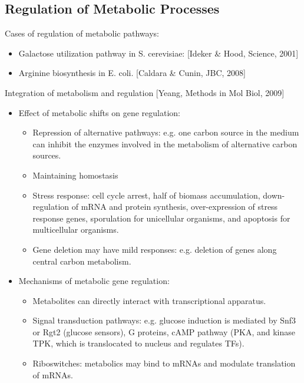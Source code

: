 \documentclass{report}
\begin{document}
\subsection{Regulation of Metabolic Processes}

Cases of regulation of metabolic pathways: 
\begin{itemize}
	\item Galactose utilization pathway in S. cerevisiae: [Ideker \& Hood, Science, 2001]
	\item Arginine biosynthesis in E. coli. [Caldara \& Cunin, JBC, 2008]
\end{itemize}

Integration of metabolism and regulation [Yeang, Methods in Mol Biol, 2009]
\begin{itemize}
\item Effect of metabolic shifts on gene regulation: 
\begin{itemize}
	\item Repression of alternative pathways: e.g. one carbon source in the medium can inhibit the enzymes involved in the metabolism of alternative carbon sources. 
	\item Maintaining homostasis
	\item Stress response: cell cycle arrest, half of biomass accumulation, down-regulation of mRNA and protein synthesis, over-expression of stress response genes, sporulation for unicellular organisms, and apoptosis for multicellular organisms.
	\item Gene deletion may have mild responses: e.g. deletion of genes along central carbon metabolism. 
\end{itemize}

\item Mechanisms of metabolic gene regulation: 
\begin{itemize}
	\item Metabolites can directly interact with transcriptional apparatus. 
	\item Signal transduction pathways: e.g. glucose induction is mediated by Snf3 or Rgt2 (glucose sensors), G proteins, cAMP pathway (PKA, and kinase TPK, which is translocated to nucleus and regulates TFs). 
	\item Riboswitches: metabolics may bind to mRNAs and modulate translation of mRNAs. 
\end{itemize}


\end{itemize}
\end{document}
